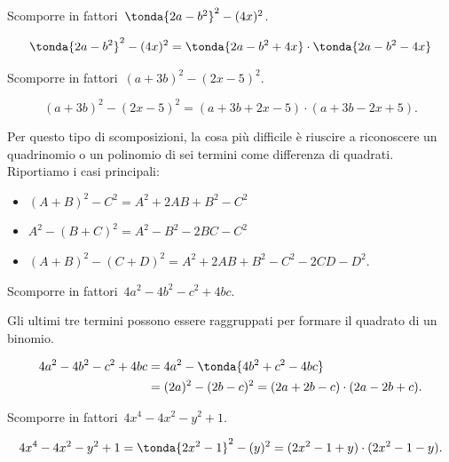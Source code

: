 \begin{esempio}{}{}
Scomporre in fattori~\(\tonda{2a-b^{2}}^{2}-(4x)^{2}\).

\vspace{-1.0em}
\[\tonda{2a-b^{2}}^{2}-(4x)^{2}=
\tonda{2a-b^{2}+4x}\cdot \tonda{2a-b^{2}-4x}\]
\end{esempio}

\begin{esempio}{}{}
Scomporre in fattori~\((a+3b)^{2}-(2x-5)^{2}\).

\vspace{-1.0em}
\[(a+3b)^{2}-(2x-5)^{2}=(a+3b+2x-5)\cdot (a+3b-2x+5).\]
\end{esempio}

Per questo tipo di scomposizioni, la cosa più difficile è riuscire a 
riconoscere un quadrinomio o un polinomio di sei termini come differenza 
di quadrati. Riportiamo i casi principali:
\begin{itemize}[nosep]
\item \((A+B)^{2}-C^{2}=A^{{2}}+2AB+B^{2}-C^{2}\)
\item \(A^{2}-(B+C)^{2}=A^{2}-B^{2}-2BC-C^{2}\)
\item \((A+B)^{2}-(C+D)^{2}=A^{2}+2AB+B^{2}-C^{2}-2CD-D^{2}\).
\end{itemize}

\begin{esempio}{}{}
Scomporre in fattori~\(4a^{2}-4b^{2}-c^{2}+4bc\).

Gli ultimi tre termini possono essere raggruppati per formare il 
quadrato di un binomio.

\vspace{-2.0em}
\begin{equation*}
  \begin{split}
    4a^{2}-4b^{2}-c^{2}+4bc &=4a^{2}-\tonda{4b^{2}+c^{2}-4bc} \\
                &= (2a)^{2}-(2b-c)^{2}=(2a+2b-c)\cdot (2a-2b+c).
  \end{split}
\end{equation*}
\end{esempio}

\begin{esempio}{}{}
Scomporre in fattori~\(4x^4-4x^2-y^{2}+1\).

\vspace{-2.0em}
\[4x^4-4x^2-y^{2}+1=\tonda{2x^2-1}^{2}-(y)^{2}=(2x^2-1+y)\cdot 
(2x^2-1-y).\]
\end{esempio}


